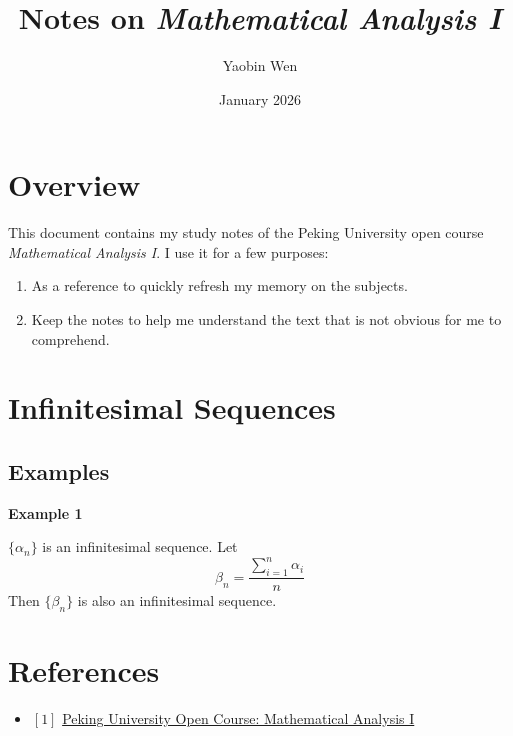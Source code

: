 \documentclass[12pt, letterpaper, oneside]{book}
\title{
  Notes on \textit{Mathematical Analysis I}
}
\author{Yaobin Wen}
\date{January 2026}
\begin{document}
\maketitle
\tableofcontents

\chapter*{Overview}

This document contains my study notes of the Peking University open course \textit{Mathematical Analysis I}. I use it
for a few purposes:

\begin{enumerate}
  \item As a reference to quickly refresh my memory on the subjects.
  \item Keep the notes to help me understand the text that is not obvious for me to comprehend.
\end{enumerate}

%
%

\chapter*{Infinitesimal Sequences}

\section{Examples}

\textbf{Example 1}

$\{\alpha_n\}$ is an infinitesimal sequence. Let
\[\beta_n = \frac{\sum_{i = 1}^{n} \alpha_i }{n}\]
Then $\{\beta_n\}$ is also an infinitesimal sequence.

%
%

\chapter*{References}

\begin{itemize}
  \item $[1]$ \href{https://resource.pku.edu.cn/index.php?r=course/detail&id=93}{Peking University Open Course: Mathematical Analysis I}
\end{itemize}
\end{document}
